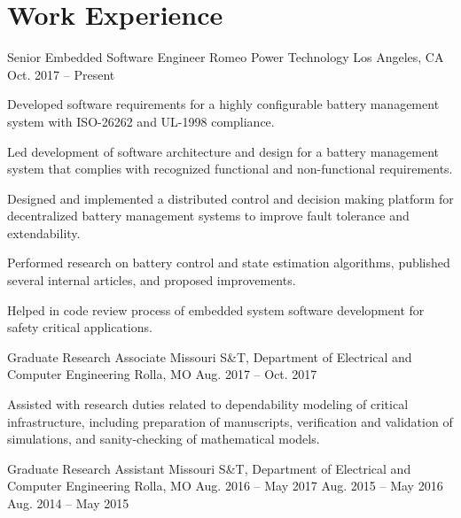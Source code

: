 \section{Work Experience}
\begin{cventries}
  \cventry
    {Senior Embedded Software Engineer}
    {Romeo Power Technology}
    {Los Angeles, CA}
    {Oct. 2017 -- Present}
    {
      \begin{cvitems}
        \item Developed software requirements for a highly configurable battery management system with ISO-26262 and UL-1998 compliance.
        \item Led development of software architecture and design for a battery management system that complies with recognized functional and non-functional requirements.
        \item Designed and implemented a distributed control and decision making platform for decentralized battery management systems to improve fault tolerance and extendability.
        \item Performed research on battery control and state estimation algorithms, published several internal articles, and proposed improvements.
        \item Helped in code review process of embedded system software development for safety critical applications.
      \end{cvitems}
    }
  \cventry
    {Graduate Research Associate}
    {Missouri S\&T, Department of Electrical and Computer Engineering}
    {Rolla, MO}
    {Aug. 2017 -- Oct. 2017}
    {
      \begin{cvitems}
        \item Assisted with research duties related to dependability modeling of critical infrastructure, including preparation of manuscripts, verification and validation of simulations, and sanity-checking of mathematical models.
      \end{cvitems}
    }
  \cventry
    {Graduate Research Assistant}
    {Missouri S\&T, Department of Electrical and Computer Engineering}
    {Rolla, MO}
    {
      Aug. 2016 -- May 2017 \linebreak\relax
      Aug. 2015 -- May 2016 \linebreak\relax
      Aug. 2014 -- May 2015 \linebreak\relax
}
\end{cventries}
